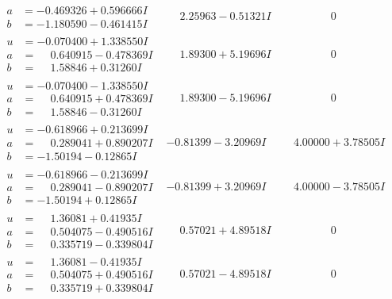 \documentclass[1p]{elsarticle_modified}
\theoremstyle{definition}
\begin{document}
$$\begin{array}{c|c|c}
\begin{aligned}
a &= -0.469326 + 0.596666 I \\
b &= -1.180590 - 0.461415 I\end{aligned}
 & \phantom{-}2.25963 - 0.51321 I & \phantom{-0.000000 } 0 \\ \hline\begin{aligned}
u &= -0.070400 + 1.338550 I \\
a &= \phantom{-}0.640915 - 0.478369 I \\
b &= \phantom{-}1.58846 + 0.31260 I\end{aligned}
 & \phantom{-}1.89300 + 5.19696 I & \phantom{-0.000000 } 0 \\ \hline\begin{aligned}
u &= -0.070400 - 1.338550 I \\
a &= \phantom{-}0.640915 + 0.478369 I \\
b &= \phantom{-}1.58846 - 0.31260 I\end{aligned}
 & \phantom{-}1.89300 - 5.19696 I & \phantom{-0.000000 } 0 \\ \hline\begin{aligned}
u &= -0.618966 + 0.213699 I \\
a &= \phantom{-}0.289041 + 0.890207 I \\
b &= -1.50194 - 0.12865 I\end{aligned}
 & -0.81399 - 3.20969 I & \phantom{-}4.00000 + 3.78505 I \\ \hline\begin{aligned}
u &= -0.618966 - 0.213699 I \\
a &= \phantom{-}0.289041 - 0.890207 I \\
b &= -1.50194 + 0.12865 I\end{aligned}
 & -0.81399 + 3.20969 I & \phantom{-}4.00000 - 3.78505 I \\ \hline\begin{aligned}
u &= \phantom{-}1.36081 + 0.41935 I \\
a &= \phantom{-}0.504075 - 0.490516 I \\
b &= \phantom{-}0.335719 - 0.339804 I\end{aligned}
 & \phantom{-}0.57021 + 4.89518 I & \phantom{-0.000000 } 0 \\ \hline\begin{aligned}
u &= \phantom{-}1.36081 - 0.41935 I \\
a &= \phantom{-}0.504075 + 0.490516 I \\
b &= \phantom{-}0.335719 + 0.339804 I\end{aligned}
 & \phantom{-}0.57021 - 4.89518 I & \phantom{-0.000000 } 0 \\ \hline\begin{aligned}

\end{aligned}
\end{array}$$
\end{document}
